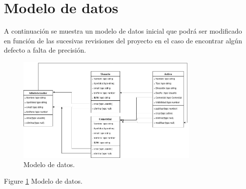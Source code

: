\newpage
\section{Modelo de datos}
\par A continuación se muestra un modelo de datos inicial que podrá ser modificado en función de las sucesivas revisiones del proyecto en el caso de encontrar algún defecto a falta de precisión.

\begin{figure}
  \centering
    \includegraphics[width=0.8\textwidth]{img/datamodel.jpeg}
  \caption{Modelo de datos.}
  \label{fig:datamodel}
\end{figure}
Figure \ref{fig:datamodel} Modelo de datos.
